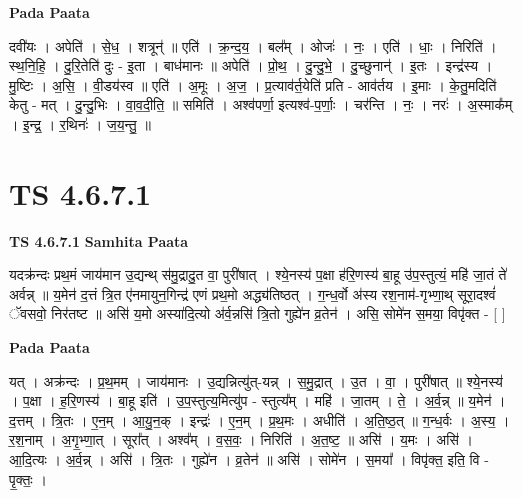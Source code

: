 \documentclass[17pt]{extarticle}
\begin{document}
\textbf{Pada Paata} \newline

दवी॑यः । अपेति॑ । से॒ध॒ । शत्रून्॑ ॥ एति॑ । क्र॒न्द॒य॒ । बल᳚म् । ओजः॑ । नः॒ । एति॑ । धाः॒ । निरिति॑ । स्थ॒नि॒हि॒ । दु॒रि॒तेति॑ दुः - इ॒ता । बाध॑मानः ॥ अपेति॑ । प्रो॒थ॒ । दु॒न्दु॒भे॒ । दु॒च्छुनान्॑ । इ॒तः । इन्द्र॑स्य । मु॒ष्टिः । अ॒सि॒ । वी॒डय॑स्व ॥ एति॑ । अ॒मूः । अ॒ज॒ । प्र॒त्याव॑र्त॒येति॑ प्रति - आव॑र्तय । इ॒माः । के॒तु॒मदिति॑ केतु - मत् । दु॒न्दु॒भिः । वा॒व॒दी॒ति॒ ॥ समिति॑ । अश्व॑पर्णा॒ इत्यश्व॑-प॒र्णाः॒ । चर॑न्ति । नः॒ । नरः॑ । अ॒स्माक᳚म् । इ॒न्द्र॒ । र॒थिनः॑ । ज॒य॒न्तु॒ ॥  \newline





\section{ TS 4.6.7.1 }

\textbf{TS 4.6.7.1 } \newline
\textbf{Samhita Paata} \newline

यदक्र॑न्दः प्रथ॒मं जाय॑मान उ॒द्यन्थ् स॑मु॒द्रादु॒त वा॒ पुरी॑षात् । श्ये॒नस्य॑ प॒क्षा ह॑रि॒णस्य॑ बा॒हू उ॑प॒स्तुत्यं॒ महि॑ जा॒तं ते॑ अर्वन्न् ॥ य॒मेन॑ द॒त्तं त्रि॒त ए॑नमायुन॒गिन्द्र॑ एणं प्रथ॒मो अद्ध्य॑तिष्ठत् । ग॒न्ध॒र्वो अ॑स्य रश॒नाम॑-गृभ्णा॒थ् सूरा॒दश्वं॑ ॅवसवो॒ निर॑तष्ट ॥ असि॑ य॒मो अस्या॑दि॒त्यो अ॑र्व॒न्नसि॑ त्रि॒तो गुह्ये॑न व्र॒तेन॑ । असि॒ सोमे॑न स॒मया॒ विपृ॑क्त - [  ] \newline

\textbf{Pada Paata} \newline

यत् । अक्र॑न्दः । प्र॒थ॒मम् । जाय॑मानः । उ॒द्यन्नित्यु॑त्-यन्न् । स॒मु॒द्रात् । उ॒त । वा॒ । पुरी॑षात् ॥ श्ये॒नस्य॑ । प॒क्षा । ह॒रि॒णस्य॑ । बा॒हू इति॑ । उ॒प॒स्तुत्य॒मित्यु॑प - स्तुत्य᳚म् । महि॑ । जा॒तम् । ते॒ । अ॒र्व॒न्न् ॥ य॒मेन॑ । द॒त्तम् । त्रि॒तः । ए॒न॒म् । आ॒यु॒न॒क् । इन्द्रः॑ । ए॒न॒म् । प्र॒थ॒मः । अधीति॑ । अ॒ति॒ष्ठ॒त् ॥ ग॒न्ध॒र्वः । अ॒स्य॒ । र॒श॒नाम् । अ॒गृ॒भ्णा॒त् । सूरा᳚त् । अश्व᳚म् । व॒स॒वः॒ । निरिति॑ । अ॒त॒ष्ट॒ ॥ असि॑ । य॒मः । असि॑ । आ॒दि॒त्यः । अ॒र्व॒न्न् । असि॑ । त्रि॒तः । गुह्ये॑न । व्र॒तेन॑ ॥ असि॑ । सोमे॑न । स॒मया᳚ । विपृ॑क्त॒ इति॒ वि - पृ॒क्तः॒ ।  \newline




\end{document}
